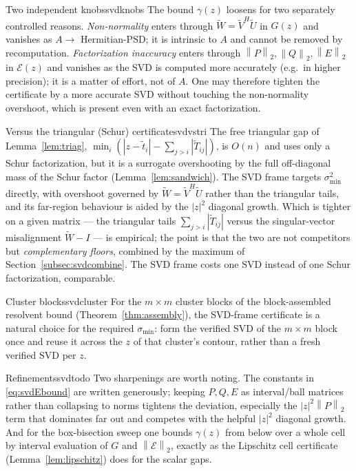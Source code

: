 \documentclass[11pt, a4paper]{article}
\numberwithin{equation}{section}
\newcommand{\norm}[1]{\left\|#1\right\|}
\newcommand{\abs}[1]{\left|#1\right|}
\newcommand{\tT}{\widetilde{T}}
\newcommand{\tU}{\widetilde{U}}
\newcommand{\tV}{\widetilde{V}}
\newcommand{\tW}{\widetilde{W}}
\begin{document}
\begin{remark}{Two independent knobs}{svdknobs}
  The bound $\gamma(z)$ loosens for two separately controlled reasons.
  \emph{Non-normality} enters through $\tW = \tV^H\tU$ in $G(z)$ and vanishes as
  $A \to$ Hermitian-PSD; it is intrinsic to $A$ and cannot be removed by
  recomputation.  \emph{Factorization inaccuracy} enters through
  $\norm{P}_2,\norm{Q}_2,\norm{E}_2$ in $\mathcal{E}(z)$ and vanishes as the SVD
  is computed more accurately (e.g.\ in higher precision); it is a matter of
  effort, not of $A$.  One may therefore tighten the certificate by a more
  accurate SVD without touching the non-normality overshoot, which is present
  even with an exact factorization.
\end{remark}

\begin{remark}{Versus the triangular (Schur) certificate}{svdvstri}
  The free triangular gap of Lemma~\ref{lem:triag}, $\min_i(\abs{z - \tilde t_i}
  - \sum_{j>i}\abs{\tT_{ij}})$, is $O(n)$ and uses only a Schur factorization,
  but it is a surrogate overshooting by the full off-diagonal mass of the Schur
  factor (Lemma~\ref{lem:sandwich}).  The SVD frame targets $\sigma_{\min}^2$
  directly, with overshoot governed by $\tW = \tV^H\tU$ rather than the
  triangular tails, and its far-region behaviour is aided by the $\abs{z}^2$
  diagonal growth.  Which is tighter on a given matrix --- the triangular tails
  $\sum_{j>i}\abs{\tT_{ij}}$ versus the singular-vector misalignment $\tW - I$
  --- is empirical; the point is that the two are not competitors but
  \emph{complementary floors}, combined by the maximum of
  Section~\ref{subsec:svdcombine}.  The SVD frame costs one SVD instead of one
  Schur factorization, comparable.
\end{remark}

\begin{remark}{Cluster blocks}{svdcluster}
  For the $m\times m$ cluster blocks of the block-assembled resolvent bound
  (Theorem~\ref{thm:assembly}), the SVD-frame certificate is a natural choice for
  the required $\sigma_{\min}$: form the verified SVD of the $m\times m$ block
  once and reuse it across the $z$ of that cluster's contour, rather than a fresh
  verified SVD per $z$.
\end{remark}

\begin{remark}{Refinements}{svdtodo}
  Two sharpenings are worth noting.  The constants in \eqref{eq:svdEbound} are
  written generously; keeping $P, Q, E$ as interval/ball matrices rather than
  collapsing to norms tightens the deviation, especially the $\abs{z}^2\norm{P}_2$
  term that dominates far out and competes with the helpful $\abs{z}^2$ diagonal
  growth.  And for the box-bisection sweep one bounds
  $\gamma(z)$ from below over a whole cell by interval evaluation of $G$ and
  $\norm{\mathcal{E}}_2$, exactly as the Lipschitz cell certificate
  (Lemma~\ref{lem:lipschitz}) does for the scalar gaps.
\end{remark}
\end{document}
